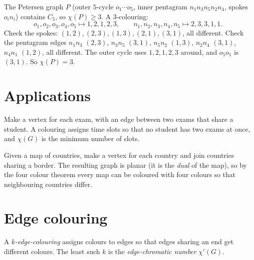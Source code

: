 The Petersen graph $P$ (outer $5$-cycle $o_1\cdots o_5$, inner pentagram $n_1n_3n_5n_2n_4$, spokes
$o_in_i$) contains $C_5$, so $\chi(P) \ge 3$. A $3$-colouring:
\[
o_1, o_2, o_3, o_4, o_5 \mapsto 1, 2, 1, 2, 3,\qquad
n_1, n_2, n_3, n_4, n_5 \mapsto 2, 3, 3, 1, 1.
\]
Check the spokes: $(1,2), (2,3), (1,3), (2,1), (3,1)$, all different. Check the pentagram edges
$n_1n_3$ $(2,3)$, $n_3n_5$ $(3,1)$, $n_5n_2$ $(1,3)$, $n_2n_4$ $(3,1)$, $n_4n_1$ $(1,2)$, all
different. The outer cycle uses $1,2,1,2,3$ around, and $o_5o_1$ is $(3,1)$. So $\chi(P) = 3$.

\begin{center}
\end{center}

\section{Applications}

\begin{example}
Make a vertex for each exam, with an edge between two exams that share a student. A colouring
assigns time slots so that no student has two exams at once, and $\chi(G)$ is the minimum number
of slots.
\end{example}

\begin{example}
Given a map of countries, make a vertex for each country and join countries sharing a border.
The resulting graph is planar (it is the \emph{dual} of the map), so by the four colour theorem
every map can be coloured with four colours so that neighbouring countries differ.
\end{example}

\section{Edge colouring}

\begin{definition}
A \emph{$k$-edge-colouring} assigns colours to edges so that edges sharing an end get different
colours. The least such $k$ is the \emph{edge-chromatic number} $\chi'(G)$.
\end{definition}

